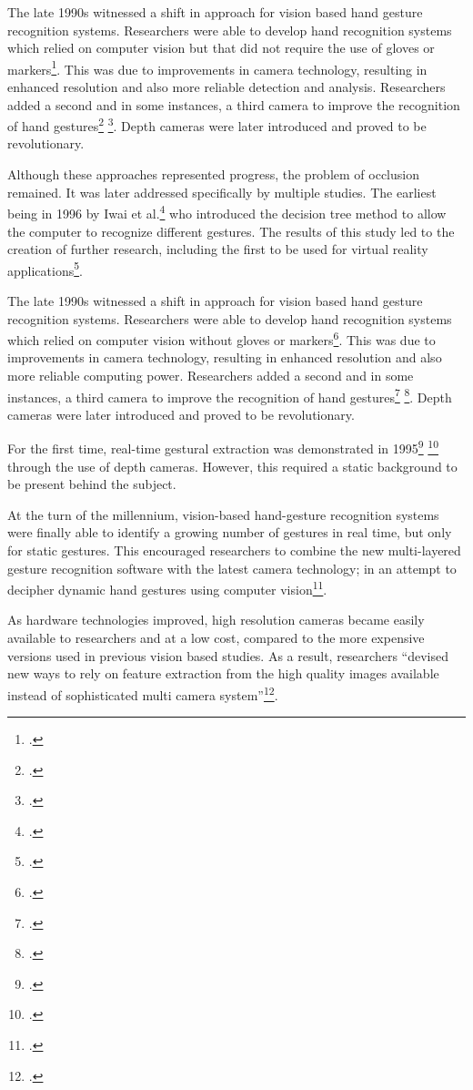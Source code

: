 The late 1990s witnessed a shift in approach for vision based hand gesture recognition systems. Researchers were able to develop hand recognition systems which relied on computer vision but that did not require the use of gloves or markers\footcite{Rehg1994}. This was due to improvements in camera technology, resulting in enhanced resolution and also more reliable detection and analysis. Researchers added a second and in some instances, a third camera to improve the recognition of hand gestures\footcite{Gennery1992} \footcite{Darrell1993}. Depth cameras were later introduced and proved to be revolutionary. 

Although these approaches represented progress, the problem of occlusion remained. It was later addressed specifically by multiple studies. The earliest being in 1996 by Iwai et al.\footcite{Iwai1996} who introduced the decision tree method to allow the computer to recognize different gestures. The results of this study led to the creation of further research, including the first to be used for virtual reality applications\footcite{Wang2009}. 

The late 1990s witnessed a shift in approach for vision based hand gesture recognition systems. Researchers were able to develop hand recognition systems which relied on computer vision without gloves or markers\footcite{Rehg1994}. This was due to improvements in camera technology, resulting in enhanced resolution and also more reliable computing power. Researchers added a second and in some instances, a third camera to improve the recognition of hand gestures\footcite{Gennery1992} \footcite{Darrell1993}. Depth cameras were later introduced and proved to be revolutionary. 

For the first time, real-time gestural extraction was demonstrated in 1995\footcite{Bobick1995} \footcite{Utsumi1999} through the use of depth cameras. However, this required a static background to be present behind the subject.  

At the turn of the millennium, vision-based hand-gesture recognition systems were finally able to identify a growing number of gestures in real time, but only for static gestures. This encouraged researchers to combine the new multi-layered gesture recognition software with the latest camera technology; in an attempt to decipher dynamic hand gestures using computer vision\footcite{Starner1995}. 

As hardware technologies improved, high resolution cameras became easily available to researchers and at a low cost, compared to the more expensive versions used in previous vision based studies. As a result, researchers ``devised new ways to rely on feature extraction from the high quality images available instead of sophisticated multi camera system''\footcite{Chen2003}. 

